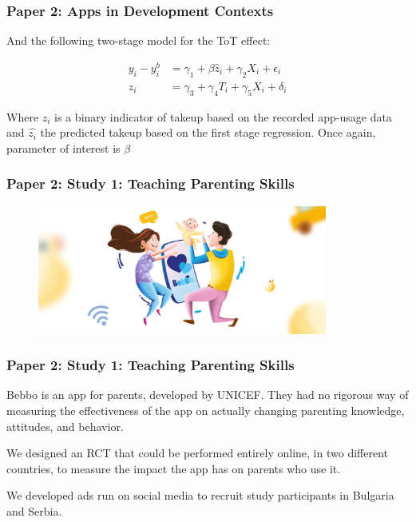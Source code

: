 \documentclass[aspectratio=169]{beamer}
\begin{document}
\begin{frame}
\frametitle{Paper 2: Apps in Development Contexts}

And the following two-stage model for the ToT effect: 

\begin{align*}
y_{i} - y^{b}_i &= \gamma_1 + \beta \hat{z}_{i} + \gamma_2X_{i} + \epsilon_i \\  
z_{i} &= \gamma_3 + \gamma_4 T_{i} + \gamma_5X_{i} + \delta_i
\end{align*}  


Where $z_i$ is a binary indicator of takeup based on the recorded app-usage data and $\hat{z_i}$ the predicted takeup based on the first stage regression. Once again, parameter of interest is $\beta$

\end{frame}

\begin{frame}
\frametitle{Paper 2: Study 1: Teaching Parenting Skills}

\begin{figure}[H]
\includegraphics[width=360px]{resources/bebbo-illustration.jpg} 
\end{figure}

\end{frame}

\begin{frame}
\frametitle{Paper 2: Study 1: Teaching Parenting Skills}

Bebbo is an app for parents, developed by UNICEF. They had no rigorous way of measuring the effectiveness of the app on actually changing parenting knowledge, attitudes, and behavior. 

We designed an RCT that could be performed entirely online, in two different countries, to measure the impact the app has on parents who use it.

We developed ads run on social media to recruit study participants in Bulgaria and Serbia.
\end{frame}
\end{document}
